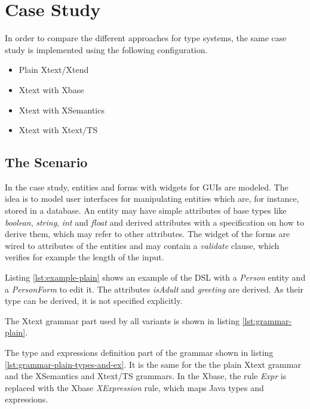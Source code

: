 \section{Case Study}

In order to compare the different approaches for type systems, the same case study is implemented using the following configuration.

\begin{itemize}
\item Plain Xtext/Xtend
\item Xtext with Xbase
\item Xtext with XSemantics
\item Xtext with Xtext/TS
\end{itemize}

\subsection{The Scenario}
In the case study, entities and forms with widgets for GUIs are modeled. The idea is to model user interfaces for manipulating entities which are, for instance, stored in a database. An entity may have simple attributes of base types like \emph{boolean}, \emph{string}, \emph{int} and \emph{float} and derived attributes with a specification on how to derive them, which may refer to other attributes. The widget of the forms are wired to attributes of the entities and may contain a \emph{validate} clause, which verifies for example the length of the input.

Listing \ref{lst:example-plain} shows an example of the DSL with a \emph{Person} entity and a \emph{PersonForm} to edit it. The attributes \emph{isAdult} and \emph{greeting} are derived. As their type can be derived, it is not specified explicitly.



The Xtext grammar part used by all variants is shown in listing \ref{lst:grammar-plain}. 



The type and expressions definition part of the grammar shown in listing \ref{lst:grammar-plain-types-and-ex}. It is the same for the the plain Xtext grammar and the XSemantics and Xtext/TS grammars. In the Xbase, the rule \emph{Expr} is replaced with the Xbase \emph{XExpression} rule, which maps Java types and expressions.

